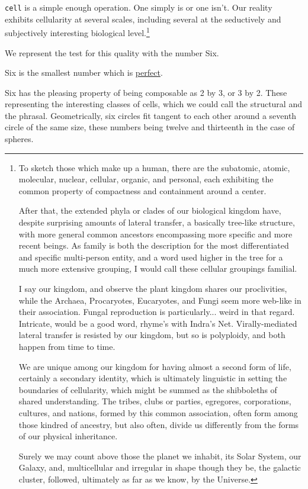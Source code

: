 \documentclass[twoside]{article}
\begin{document}
\texttt{cell} is a simple enough operation. One simply is or one isn't. Our reality exhibits cellularity at several scales, including several at the seductively and subjectively interesting biological level.\footnote{To sketch those which make up a human, there are the subatomic, atomic, molecular, nuclear, cellular, organic, and personal, each exhibiting the common property of compactness and containment around a center.

After that, the extended phyla or clades of our biological kingdom have, despite surprising amounts of lateral transfer, a basically tree-like structure, with more general common ancestors encompassing more specific and more recent beings. As family is both the description for the most differentiated and specific multi-person entity, and a word used higher in the tree for a much more extensive grouping, I would call these cellular groupings familial.

I say our kingdom, and observe the plant kingdom shares our proclivities, while the Archaea, Procaryotes, Eucaryotes, and Fungi seem more web-like in their association. Fungal reproduction is particularly... weird in that regard. Intricate, would be a good word, rhyme's with Indra's Net. Virally-mediated lateral transfer is resisted by our kingdom, but so is polyploidy, and both happen from time to time.

We are unique among our kingdom for having almost a second form of life, certainly a secondary identity, which is ultimately linguistic in setting the boundaries of cellularity, which might be summed as the shibboleths of shared understanding. The tribes, clubs or parties, egregores, corporations, cultures, and nations, formed by this common association, often form among those kindred of ancestry, but also often, divide us differently from the forms of our physical inheritance.

Surely we may count above those the planet we inhabit, its Solar System, our Galaxy, and, multicellular and irregular in shape though they be, the galactic cluster, followed, ultimately as far as we know, by the Universe.}

We represent the test for this quality with the number Six.

Six is the smallest number which is \href{https://en.wikipedia.org/wiki/Perfect_number}{perfect}.

Six has the pleasing property of being composable as 2 by 3, or 3 by 2. These representing the interesting classes of cells, which we could call the structural and the phrasal. Geometrically, six circles fit tangent to each other around a seventh circle of the same size, these numbers being twelve and thirteenth in the case of spheres.
\end{document}
